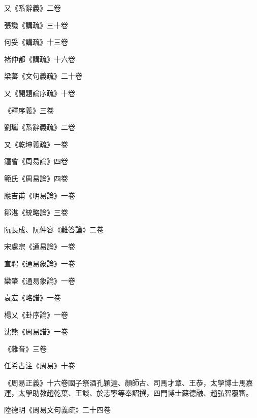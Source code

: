 \begin{pinyinscope}
 又《系辭義》二卷



 張譏《講疏》三十卷



 何妥《講疏》十三卷



 褚仲都《講疏》十六卷



 梁蕃《文句義疏》二十卷



 又《開題論序疏》十卷



 《釋序義》三卷



 劉瓛《系辭義疏》二卷



 又《乾坤義疏》一卷



 鐘會《周易論》四卷



 範氏《周易論》四卷



 應吉甫《明易論》一卷



 鄒湛《統略論》三卷



 阮長成、阮仲容《難答論》二卷



 宋處宗《通易論》一卷



 宣聘《通易象論》一卷



 欒肇《通易象論》一卷



 袁宏《略譜》一卷



 楊乂《卦序論》一卷



 沈熊《周易譜》一卷



 《雜音》三卷



 任希古注《周易》十卷



 《周易正義》十六卷國子祭酒孔穎達、顏師古、司馬才章、王恭，太學博士馬嘉運，太學助教趙乾葉、王談、於志寧等奉詔撰，四門博士蘇德融、趙弘智覆審。



 陸德明《周易文句義疏》二十四卷




\end{pinyinscope}

